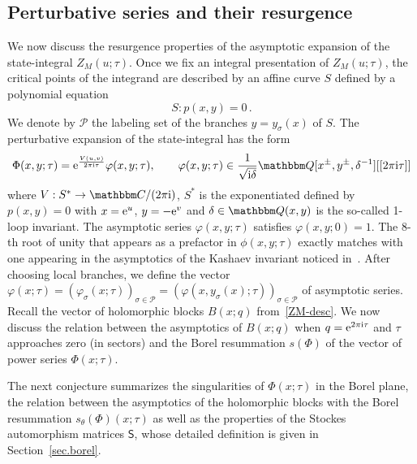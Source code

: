 \documentclass[12pt,reqno]{amsart}
\theoremstyle{definition}
\def\BQ{\mathbbm Q}
\def\BC{\mathbbm C}
\def\calP{\mathcal P}
\def\s{\sigma}
\def\th{\theta}
\def\ri{\mathrm{i}}
\def\re{{\rm e}}
\def\ri{{\rm i}}
\def\ms{\mathsf}
\begin{document}
\subsection{Perturbative series and their resurgence}
\label{sub.pert}

We now discuss the resurgence properties of the asymptotic
expansion of the state-integral $Z_M(u;\tau)$. Once we fix an
integral presentation of $Z_M(u;\tau)$, the critical points of
the integrand are described by an affine curve $S$ defined
by a polynomial equation
\begin{equation}
\label{S}
S: p(x,y)=0 \,.
\end{equation}
We denote by $\calP$ the labeling set of the branches
$y=y_\s(x)$ of $S$. The perturbative expansion of the
state-integral  has the form
\begin{equation}
  \label{Phix}
  \Phi(x,y;\tau) =
  \re^{\frac{V(u,v)}{2\pi \ri \tau}} \varphi(x,y;\tau), \qquad
  \varphi(x,y;\tau) \in \frac{1}{\sqrt{\ri\delta}} \BQ[x^\pm, y^\pm,
  \delta^{-1}][[2\pi \ri \tau]]
\end{equation}
where $V: S^* \to \BC/(2\pi \ri)$, $S^*$ is the exponentiated defined
by $p(x,y)=0$ with $x=\re^{u}$, $y=-\re^{v}$ and
$\delta \in \BQ(x,y)$ is the so-called 1-loop invariant.  
The asymptotic series $\varphi(x,y;\tau)$ satisfies
$\varphi(x,y;0) = 1$.  The 8-th root of unity that appears as a
prefactor in $\phi(x,y;\tau)$ exactly matches with one appearing in
the asymptotics of the Kashaev invariant noticed
in~\cite[Sec.1]{GZ:kashaev}. After choosing local branches, we define
the vector
$\varphi(x;\tau)=(\varphi_\s(x;\tau))_{\s\in\calP} =
(\varphi(x,y_\s(x);\tau))_{\s \in \calP}$ of asymptotic series.
Recall the vector of holomorphic blocks $B(x;q)$ from~\eqref{ZM-desc}.
We now discuss the relation between the asymptotics of
$B(x;q)$ when $q=\re^{2\pi \ri \tau}$ and $\tau$ approaches zero (in
sectors) and the Borel resummation $s(\Phi)$ of the vector of power
series $\Phi(x;\tau)$.

The next conjecture summarizes the singularities of $\Phi(x;\tau)$
in the Borel plane, the relation between the asymptotics of the
holomorphic blocks with the Borel resummation $s_\th(\Phi)(x;\tau)$
as well as the properties of the Stockes automorphism matrices
$\ms{S}$, whose detailed definition is given in Section~\ref{sec.borel}.
\end{document}

